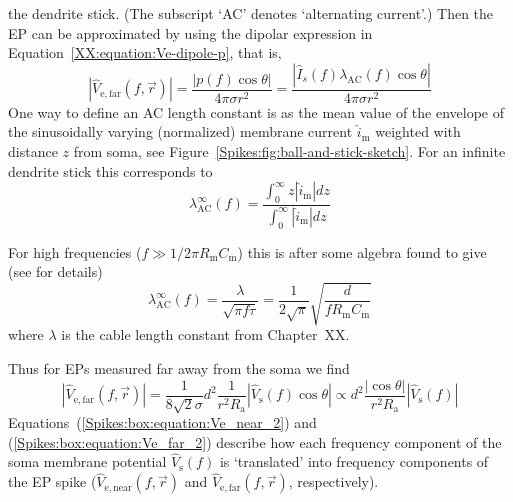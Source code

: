 the dendrite stick. (The subscript `AC' denotes `alternating current'.)
Then the EP can be approximated by using the 
dipolar expression in Equation~\ref{XX:equation:Ve-dipole-p}, that is,
\begin{equation}
  |\hat{V}_\mathrm{e,far}(f,\vec{r})| =  \frac{|p(f) \cos \theta|}{4 \pi \sigma r^2} 
                                            = \frac{| \hat{I}_{s}(f) \lambda_\mathrm{AC}(f) \cos \theta|}{4 \pi \sigma r^2}   
                                                                                        \label{Spikes:box:equation:Ve_far_1}
\end{equation}
One way to define an AC length constant is as the mean value of the 
envelope of the sinusoidally varying (normalized) membrane current
$\hat{i}_\mathrm{m}$ weighted with distance $z$ from soma, 
see Figure~\ref{Spikes:fig:ball-and-stick-sketch}. 
For an infinite dendrite stick this corresponds to
%
\begin{equation}
  \lambda_\mathrm{AC}^\infty(f) = \frac{\int_0^\infty z |\hat{i}_\mathrm{m}| dz}{\int_0^\infty |\hat{i}_\mathrm{m}| dz} 
\nonumber
\end{equation}
%

For high frequencies ($f \gg 1/2 \pi R_\mathrm{m} C_\mathrm{m}$) this is after some algebra 
found to give (see  for details)
%
\begin{equation}
 \lambda_\mathrm{AC}^\infty(f) =  \frac{\lambda}{\sqrt{\pi f \tau}} = 
  \frac{1}{2\sqrt{\pi}} \sqrt{\frac{d}{f R_\mathrm{m} C_\mathrm{m}}}
\label{Spikes:box:equation:approx_lambda_ac}
\end{equation}
%
where $\lambda$ is the cable length constant from 
Chapter~XX. 

%
Thus for EPs measured far away from the soma we find 
%  
\begin{equation}
  |\hat{V}_\mathrm{e,far}(f,\vec{r})|  = \frac{1}{8 \sqrt{2} \sigma} d^{2} \frac{1}{r^2  R_\mathrm{a}} 
      |\hat{V}_\mathrm{s}(f) \cos \theta | 
  \propto d^{2} \frac{|\cos \theta|}{r^2  R_\mathrm{a}} |\hat{V}_\mathrm{s}(f)| 
  \label{Spikes:box:equation:Ve_far_2}
\end{equation}
%
Equations~(\ref{Spikes:box:equation:Ve_near_2}) and (\ref{Spikes:box:equation:Ve_far_2}) describe how each frequency component of 
the soma membrane potential  $\hat{V}_\mathrm{s}(f)$ is `translated' into frequency components of the 
EP spike ($\hat{V}_\mathrm{e,near}(f,\vec{r})$ and $\hat{V}_\mathrm{e,far}(f,\vec{r})$, respectively). 



